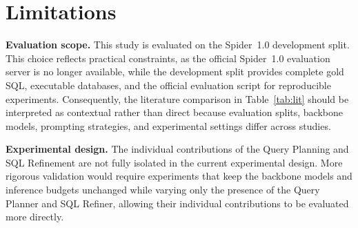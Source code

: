 \documentclass{svproc}
\begin{document}
\section{Limitations}
\label{sec:limits}

\textbf{Evaluation scope.}
This study is evaluated on the Spider~1.0 development split. This choice reflects practical constraints, as the official Spider~1.0 evaluation server is no longer available, while the development split provides complete gold SQL, executable databases, and the official evaluation script for reproducible experiments. Consequently, the literature comparison in Table~\ref{tab:lit} should be interpreted as contextual rather than direct because evaluation splits, backbone models, prompting strategies, and experimental settings differ across studies.


\textbf{Experimental design.}
The individual contributions of the Query Planning and SQL Refinement are not fully isolated in the current experimental design. More rigorous validation would require experiments that keep the backbone models and inference budgets unchanged while varying only the presence of the Query Planner and SQL Refiner, allowing their individual contributions to be evaluated more directly. 


\end{document}
